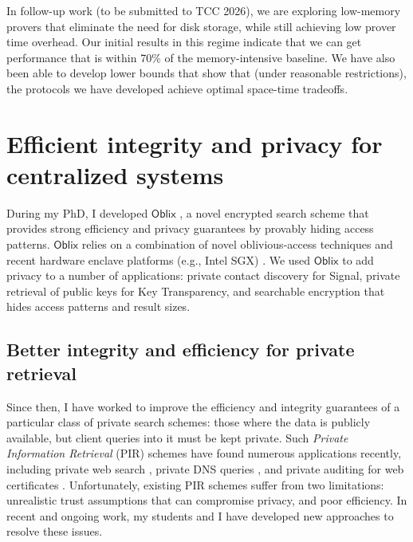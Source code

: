 \documentclass[11pt,letterpaper]{article}
\theoremstyle{definition} %
\theoremstyle{remark} %
\newcommand{\pratyush}[1]{\dtcolornote[Pratyush]{blue}{#1}}
\begin{document}
In follow-up work (to be submitted to TCC 2026), we are exploring low-memory provers that eliminate the need for disk storage, while still achieving low prover time overhead.
Our initial results in this regime indicate that we can get performance that is within 70\% of the memory-intensive baseline.
We have also been able to develop lower bounds that show that (under reasonable restrictions), the protocols we have developed achieve optimal space-time tradeoffs.




\section{Efficient integrity and privacy for centralized systems}
\label{sec:centralized}

During my PhD, I developed $\mathsf{Oblix}$ \cite{MishraPCCP18}, a novel encrypted search scheme that provides strong efficiency and privacy guarantees by provably hiding access patterns. $\mathsf{Oblix}$ relies on a combination of novel oblivious-access techniques and recent hardware enclave platforms (e.g., Intel SGX) \cite{McKeenABRSSS13}.
We used $\mathsf{Oblix}$ to add privacy to a number of applications:
private contact discovery for Signal, private retrieval of public keys for Key Transparency, and searchable encryption that hides access patterns and result sizes.

\subsection{Better integrity and efficiency for private retrieval}

\pratyush{Mention downside: trusted hardware.}

Since then, I have worked to improve the efficiency and integrity guarantees of a particular class of private search schemes: those where the data is publicly available, but client queries into it must be kept private.
Such \emph{Private Information Retrieval} (PIR) schemes have found numerous applications recently, including private web search \cite{Tiptoe}, private DNS queries \cite{blah}, and private auditing for web certificates \cite{SimplePIR}.
Unfortunately, existing PIR schemes suffer from two limitations: unrealistic trust assumptions that can compromise privacy, and poor efficiency.
In recent and ongoing work, my students and I have developed new approaches to resolve these issues.
\end{document}
